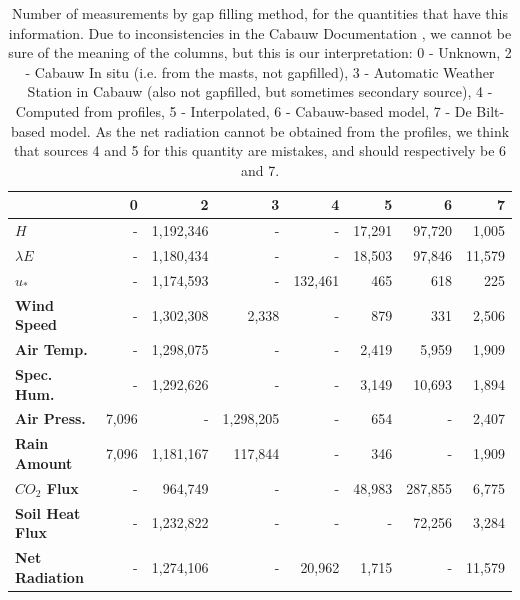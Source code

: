 \documentclass[a4paper]{book}
\begin{document}
\begin{table}[]
\centering
\caption{Number of measurements by gap filling method, for the quantities that have this information. Due to inconsistencies in the Cabauw Documentation \citep{cabauw_gapfilling}, we cannot be sure of the meaning of the columns, but this is our interpretation: 0 - Unknown, 2 - Cabauw In situ (i.e. from the masts, not gapfilled), 3 - Automatic Weather Station in Cabauw (also not gapfilled, but sometimes secondary source), 4 - Computed from profiles, 5 - Interpolated, 6 - Cabauw-based model, 7 - De Bilt-based model. As the net radiation cannot be obtained from the profiles, we think that sources 4 and 5 for this quantity are mistakes, and should respectively be 6 and 7.}
\label{tbl:col_gapfilled}
\begin{tabular*}{\textwidth}{l| @{\extracolsep{\fill}} rrrrrrr}
\toprule
& \textbf{0} & \textbf{2} & \textbf{3} & \textbf{4} & \textbf{5}  & \textbf{6}  & \textbf{7} \\ \midrule
\textbf{$H$} & - &  1,192,346 & - & - &  17,291 &  97,720 &  1,005 \\
\textbf{$\lambda E$} & - &  1,180,434 & - & - &  18,503 &  97,846 &  11,579 \\
\textbf{$u_*$} & - &  1,174,593 & - &  132,461 &  465 &  618 &  225 \\
\textbf{Wind Speed} & - &  1,302,308 &  2,338 & - &  879 &  331 &  2,506 \\
\textbf{Air Temp.} & - &  1,298,075 & - & - &  2,419 &  5,959 &  1,909 \\
\textbf{Spec. Hum.} & - &  1,292,626 & - & - &  3,149 &  10,693 &  1,894 \\
\textbf{Air Press.} &  7,096 & - &  1,298,205 & - &  654 & - &  2,407 \\
\textbf{Rain Amount} &  7,096 &  1,181,167 &  117,844 & - &  346 & - &  1,909 \\
\textbf{$CO_2$ Flux} & - &  964,749 & - & - &  48,983 &  287,855 &  6,775 \\
\textbf{Soil Heat Flux} & - &  1,232,822 & - & - & - &  72,256 &  3,284 \\
\textbf{Net Radiation} & - &  1,274,106 & -&  20,962 &  1,715 & - &  11,579 \\
\bottomrule
\end{tabular*}
\end{table}
\end{document}
